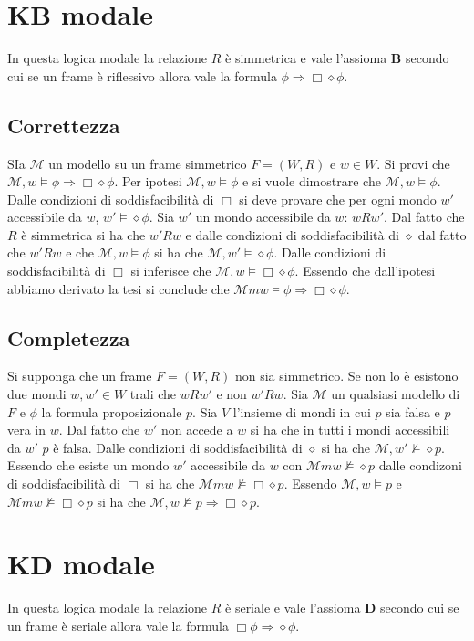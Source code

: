 \section{$\mathbf{KB}$ modale}
In questa logica modale la relazione $R$ \`e simmetrica e vale l'assioma $\mathbf{B}$ secondo cui se un frame \`e riflessivo allora vale la formula $\phi\Rightarrow\Box\diamond\phi$.
\subsection{Correttezza}
SIa $\mathcal{M}$ un modello su un frame simmetrico $F=(W, R)$ e $w\in W$. Si provi che $\mathcal{M}, w\models \phi\Rightarrow\Box\diamond\phi$. Per ipotesi $\mathcal{M}, w\models\phi$ e si vuole
dimostrare che $\mathcal{M}, w\models\phi$. Dalle condizioni di soddisfacibilit\`a di $\Box$ si deve provare che per ogni mondo $w'$ accessibile da $w$, $w'\models\diamond\phi$. Sia $w'$ un mondo 
accessibile da $w$: $wRw'$. Dal fatto che $R$ \`e simmetrica si ha che $w'Rw$ e dalle condizioni di soddisfacibilit\`a di $\diamond$ dal fatto che $w'Rw$ e che $\mathcal{M}, w\models\phi$ si ha che 
$\mathcal{M}, w'\models\diamond\phi$. Dalle condizioni di soddisfacibilit\`a di $\Box$ si inferisce che $\mathcal{M}, w\models\Box\diamond\phi$. Essendo che dall'ipotesi abbiamo derivato la tesi si 
conclude che $\mathcal{M}m w\models\phi \Rightarrow\Box\diamond\phi$.
\subsection{Completezza}
Si supponga che un frame $F=(W, R)$ non sia simmetrico. Se non lo \`e esistono due mondi $w, w'\in W$ trali che $wRw'$ e non $w'Rw$. Sia $\mathcal{M}$ un qualsiasi modello di $F$ e $\phi$ la formula
proposizionale $p$. Sia $V$ l'insieme di mondi in cui $p$ sia falsa e $p$ vera in $w$. Dal fatto che $w'$ non accede a $w$ si ha che in tutti i mondi accessibili da $w'$ $p$ \`e falsa. Dalle condizioni di 
soddisfacibilit\`a di $\diamond$ si ha che $\mathcal{M}, w'\not\models\diamond p$. Essendo che esiste un mondo $w'$ accessibile da $w$ con $\mathcal{M}m w\not\models\diamond p$ dalle condizoni di 
soddisfacibilit\`a di $\Box$ si ha che $\mathcal{M}m w\not\models\Box\diamond p$. Essendo $\mathcal{M}, w\models p$ e $\mathcal{M}m w\not\models\Box\diamond p$ si ha che $\mathcal{M}, w\not\models p\Rightarrow\Box\diamond p$.
\section{$\mathbf{KD}$ modale}
In questa logica modale la relazione $R$ \`e seriale e vale l'assioma $\mathbf{D}$ secondo cui se un frame \`e seriale allora vale la formula $\Box\phi\Rightarrow\diamond\phi$.
